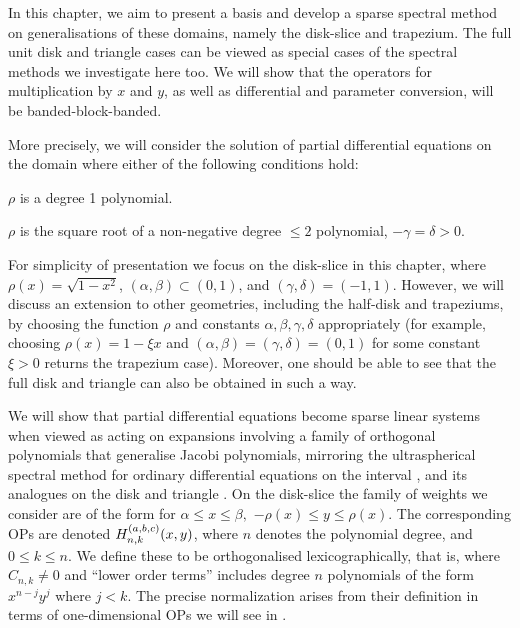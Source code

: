 In this chapter, we aim to present a basis and develop a sparse spectral method on generalisations of these domains, namely the disk-slice and trapezium. The full unit disk and triangle cases can be viewed as special cases of the spectral methods we investigate here too. We will show that the operators for multiplication by $x$ and $y$, as well as differential and parameter conversion, will be banded-block-banded.

More precisely, we will consider the solution of partial differential equations on the domain
where either of the following conditions hold:

\begin{condition}\label{cond:trap}
	$\rho$ is a degree 1 polynomial.
\end{condition}
\begin{condition}\label{cond:disk}
	$\rho$ is the square root of a non-negative degree $\le 2$ polynomial, $-\gamma = \delta > 0$.
\end{condition}

For simplicity of presentation we focus on the disk-slice in this chapter, where $\rho(x) = \sqrt{1-x^2}$, $(\alpha,\beta) \subset (0, 1)$, and $(\gamma, \delta)  = (-1,1)$. However, we will discuss an extension to other geometries, including the half-disk and trapeziums, by choosing the function $\rho$ and constants $\alpha, \beta, \gamma, \delta$ appropriately (for example, choosing $\rho(x) = 1-\xi x$ and $(\alpha,\beta) = (\gamma, \delta) = (0, 1)$ for some constant $\xi > 0$ returns the trapezium case). Moreover, one should be able to see that the full disk and triangle can also be obtained in such a way.

We will show that partial differential equations become sparse linear systems when viewed as acting on expansions involving a family of orthogonal polynomials that generalise Jacobi polynomials, mirroring the ultraspherical spectral method for ordinary differential equations on the interval \cite{olver2013fast}, and its analogues on the disk \cite{vasil2016tensor} and triangle \cite{olver2018recurrence,olver2019triangle}. On the disk-slice the family of weights we consider are of the form 
for $\alpha \leq x \leq \beta,$ $-\rho(x) \leq y \leq \rho(x)$. The corresponding OPs are denoted $H_{n,k}^{(a,b,c)}(x,y)$, where $n$ denotes the polynomial degree, and $0 \le k \le n$. We define these to be orthogonalised lexicographically, that is,
where $C_{n,k} \neq 0$ and \enquote{lower order terms} includes degree $n$ polynomials of the form $x^{n-j} y^j$ where $j < k$. The precise normalization arises from their definition in terms of one-dimensional OPs we will see in .

